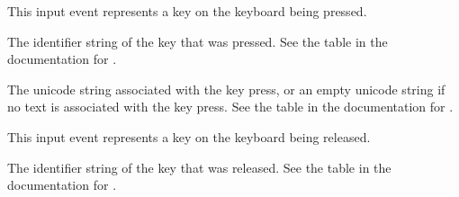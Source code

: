 \documentclass[letterpaper,10pt,english]{sphinxmanual}
\begin{document}
\begin{fulllineitems}
\label{input:sge.input.KeyPress}
This input event represents a key on the keyboard being pressed.

\begin{fulllineitems}
\label{input:sge.input.KeyPress.key}
The identifier string of the key that was pressed.  See the
table in the documentation for {\hyperref[keyboard:module\string-sge.keyboard]{\emph{}}}.

\end{fulllineitems}


\begin{fulllineitems}
\label{input:sge.input.KeyPress.char}
The unicode string associated with the key press, or an empty
unicode string if no text is associated with the key press.
See the table in the documentation for {\hyperref[keyboard:module\string-sge.keyboard]{\emph{}}}.

\end{fulllineitems}


\end{fulllineitems}


\begin{fulllineitems}
\label{input:sge.input.KeyRelease}
This input event represents a key on the keyboard being released.

\begin{fulllineitems}
\label{input:sge.input.KeyRelease.key}
The identifier string of the key that was released.  See the
table in the documentation for {\hyperref[input:sge.input.KeyPress]{\emph{}}}.

\end{fulllineitems}


\end{fulllineitems}

\end{document}
